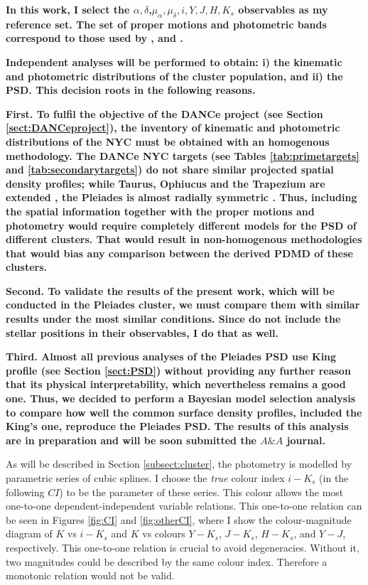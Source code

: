 \textbf{In this work, I select the $\alpha,\delta$,$\mu_{\alpha},\mu_{\delta},i,Y,J,H,K_s$ observables as my reference set. The set of proper motions and photometric bands correspond to those used by \citet{Sarro2014}, and \citet{Bouy2015}. }
 
\textbf{Independent analyses will be performed to obtain: i) the kinematic and photometric distributions of the cluster population, and ii) the PSD. This decision roots in the following reasons. }

\textbf{First. To fulfil the objective of the DANCe project (see Section \ref{sect:DANCeproject}), the inventory of kinematic and photometric distributions of the NYC must be obtained with an homogenous methodology. The DANCe NYC targets (see Tables \ref{tab:primetargets} and \ref{tab:secondarytargets}) do not share similar projected spatial density profiles; while Taurus, Ophiucus and the Trapezium are extended \cite[see for example][]{simon1997}, the Pleiades is almost radially symmetric \citep{Raboud1998}. Thus, including the spatial information together with the proper motions and photometry would require completely different models for the PSD of different clusters. That would result in non-homogenous methodologies that would bias any comparison between the derived PDMD of these clusters.}

\textbf{Second. To validate the results of the present work, which will be conducted in the Pleiades cluster, we must compare them with similar results under the most similar conditions. Since \citet{Bouy2015,Sarro2014} do not include the stellar positions in their observables, I do that as well. }

\textbf{Third. Almost all previous analyses of the Pleiades PSD use King profile (see Section \ref{sect:PSD}) without providing any further reason that its physical interpretability, which nevertheless remains a good one. Thus, we decided to perform a Bayesian model selection analysis to compare how well the common surface density profiles, included the King's one, reproduce the Pleiades PSD. The results of this analysis are in preparation and will be soon submitted the $A\&A$ journal. }

As will be described in Section \ref{subsect:cluster}, the photometry is modelled by parametric series of cubic splines. I choose the \emph{true} colour index $i-K_s$ (in the following $CI$) to be the parameter of these series. This colour allows the most one-to-one dependent-independent variable relations. This one-to-one relation can be seen in Figures \ref{fig:CI} and \ref{fig:otherCI}, where I show the colour-magnitude diagram of $K$ vs $i-K_s$ and $K$ vs colours $Y-K_s$, $J-K_s$, $H-K_s$, and $Y-J$, respectively.  This one-to-one relation is crucial to avoid degeneracies. Without it, two magnitudes could be described by the same colour index. Therefore a monotonic relation would not be valid. 

